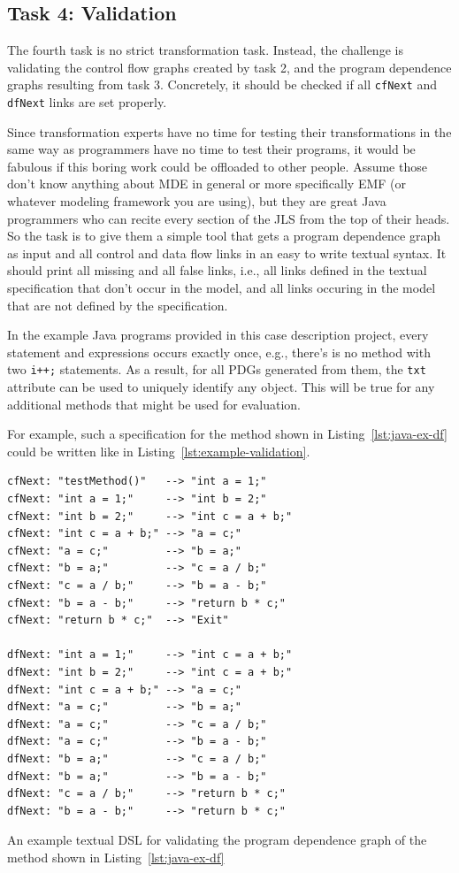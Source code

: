 \documentclass[11pt]{article}
\begin{document}
\subsection{Task 4: Validation}
\label{sec:task4-validation}

The fourth task is no strict transformation task.  Instead, the challenge is
validating the control flow graphs created by task 2, and the program
dependence graphs resulting from task 3.  Concretely, it should be checked if
all \verb|cfNext| and \verb|dfNext| links are set properly.

Since transformation experts have no time for testing their transformations in
the same way as programmers have no time to test their programs, it would be
fabulous if this boring work could be offloaded to other people.  Assume those
don't know anything about MDE in general or more specifically EMF (or whatever
modeling framework you are using), but they are great Java programmers who can
recite every section of the JLS \cite{Java7Spec} from the top of their heads.
So the task is to give them a simple tool that gets a program dependence graph
as input and all control and data flow links in an easy to write textual
syntax.  It should print all missing and all false links, i.e., all links
defined in the textual specification that don't occur in the model, and all
links occuring in the model that are not defined by the specification.

In the example Java programs provided in this case description project, every
statement and expressions occurs exactly once, e.g., there's is no method with
two \verb|i++;| statements.  As a result, for all PDGs generated from them, the
\verb|txt| attribute can be used to uniquely identify any object.  This will be
true for any additional methods that might be used for evaluation.

For example, such a specification for the method shown in
Listing~\ref{lst:java-ex-df} could be written like in
Listing~\ref{lst:example-validation}.

\begin{listing}
\begin{verbatim}
cfNext: "testMethod()"   --> "int a = 1;"
cfNext: "int a = 1;"     --> "int b = 2;"
cfNext: "int b = 2;"     --> "int c = a + b;"
cfNext: "int c = a + b;" --> "a = c;"
cfNext: "a = c;"         --> "b = a;"
cfNext: "b = a;"         --> "c = a / b;"
cfNext: "c = a / b;"     --> "b = a - b;"
cfNext: "b = a - b;"     --> "return b * c;"
cfNext: "return b * c;"  --> "Exit"

dfNext: "int a = 1;"     --> "int c = a + b;"
dfNext: "int b = 2;"     --> "int c = a + b;"
dfNext: "int c = a + b;" --> "a = c;"
dfNext: "a = c;"         --> "b = a;"
dfNext: "a = c;"         --> "c = a / b;"
dfNext: "a = c;"         --> "b = a - b;"
dfNext: "b = a;"         --> "c = a / b;"
dfNext: "b = a;"         --> "b = a - b;"
dfNext: "c = a / b;"     --> "return b * c;"
dfNext: "b = a - b;"     --> "return b * c;"
\end{verbatim}
  \caption{An example textual DSL for validating the program dependence graph
    of the method shown in Listing~\ref{lst:java-ex-df}}
  \label{lst:example-validation}
\end{listing}
\end{document}
